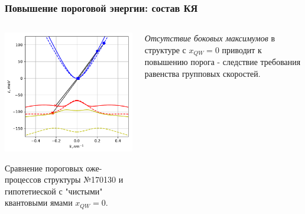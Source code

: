 \documentclass[9pt,pdf]{beamer}
\begin{document}
    \begin{frame}
        \frametitle{Повышение пороговой энергии: состав КЯ}
        \begin{columns}
            \begin{column}{0.7\textwidth}
                \begin{center}
                    \includegraphics[width=1\textwidth]{images/18um_p_vs_i.pdf}
                \end{center}
                Сравнение пороговых оже-процессов структуры №170130
                и гипотетиеской с "чистыми" квантовыми ямами $x_{QW} = 0$.
            \end{column}
            \hfill
            \begin{column}{0.3\textwidth}
                \textit{Отсутствие боковых максимумов} в структуре с $x_{QW} = 0$
                приводит к повышению порога - следствие требования равенства 
                групповых скоростей.

                \vspace{3.5cm}
            \end{column}
        \end{columns}
    \end{frame}
\end{document}

